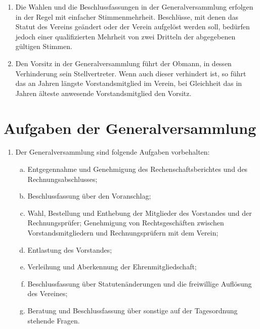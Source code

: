 \documentclass[a4paper,12pt]{article}
\begin{document}
\begin{enumerate}
\item Die Wahlen und die Beschlussfassungen in der Generalversammlung erfolgen in der Regel mit einfacher Stimmenmehrheit. Beschlüsse, mit denen das Statut des Vereins geändert oder der Verein aufgelöst werden soll, bedürfen jedoch einer qualifizierten Mehrheit von zwei Dritteln der abgegebenen gültigen Stimmen.
\item Den Vorsitz in der Generalversammlung führt der Obmann, in dessen Verhinderung sein Stellvertreter. Wenn auch dieser verhindert ist, so führt das an Jahren längste Vorstandsmitglied im Verein, bei Gleichheit das in Jahren älteste anwesende Vorstandsmitglied den Vorsitz.
\end{enumerate}

\section{Aufgaben der Generalversammlung} %
\begin{enumerate}
\item Der Generalversammlung sind folgende Aufgaben vorbehalten:
	\begin{enumerate}[(a)]
	\item Entgegennahme und Genehmigung des Rechenschaftsberichtes und des Rechnungsabschlusses;
	\item Beschlussfassung über den Voranschlag;
	\item Wahl, Bestellung und Enthebung der Mitglieder des Vorstandes und der Rechnungsprüfer; Genehmigung von Rechtsgeschäften zwischen Vorstandsmitgliedern und Rechnungsprüfern mit dem Verein;
	\item Entlastung des Vorstandes;
	\item Verleihung und Aberkennung der Ehrenmitgliedschaft;
	\item Beschlussfassung über Statutenänderungen und die freiwillige Auflösung des Vereines;
	\item Beratung und Beschlussfassung über sonstige auf der Tagesordnung stehende Fragen.
	\end{enumerate}
\end{enumerate}
\end{document}
